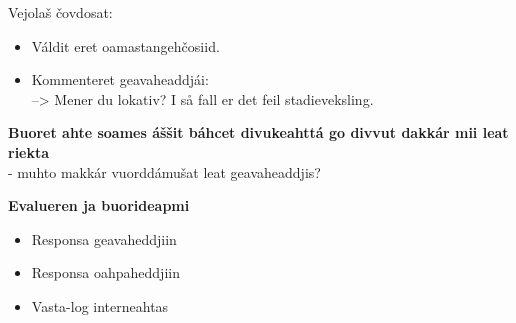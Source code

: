 \documentclass[landscape,norsk,11pt]{seminar}
\begin{document}
\begin{slide}
Vejolaš čovdosat:
\begin{itemize}
\item Váldit eret oamastangehčosiid.
\item Kommenteret geavaheaddjái: \\
--> Mener du lokativ? I så fall er det feil stadieveksling.
\end{itemize}







\newslide
\textbf{Buoret ahte soames áššit báhcet divukeahttá go divvut dakkár mii leat riekta} \\
- muhto makkár vuorddámušat leat geavaheaddjis?

\newslide
\textbf{Evalueren ja buorideapmi}
\begin{itemize}
\item{Responsa geavaheddjiin}
\item{Responsa oahpaheddjiin}
\item{Vasta-log interneahtas}
\end{itemize}


\end{slide}
\end{document}
